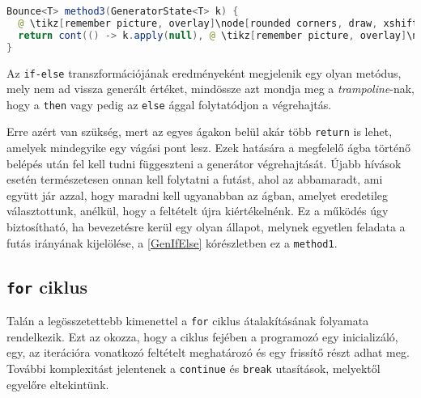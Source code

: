 \begin{center}
\begin{mdframed}
\begin{minipage}[t]{0.6\textwidth}
\begin{lstlisting}[language=Java, numbers=none, breaklines=true]
Bounce<T> method3(GeneratorState<T> k) {
  @ \tikz[remember picture, overlay]\node[rounded corners, draw, xshift=-0.1cm, inner sep=5pt, anchor=west] {Kódrészlet \#2}; \vspace*{0.3cm} @
  return cont(() -> k.apply(null), @ \tikz[remember picture, overlay]\node[rounded corners, draw, xshift=-0.2cm, inner sep=5pt, anchor=west, yshift=0.1cm] {Kifejezés \#2}; \vspace*{0.2cm} \hspace*{1.6cm} @);
}
\end{lstlisting} 
\end{minipage}
\end{mdframed}
\label{GenIfElse}
\end{center}

Az \texttt{if-else} transzformációjának eredményeként megjelenik egy olyan metódus, mely nem ad vissza generált értéket, mindössze azt mondja meg a \textit{trampoline}-nak, hogy a \texttt{then} vagy pedig az \texttt{else} ággal folytatódjon a végrehajtás.

Erre azért van szükség, mert az egyes ágakon belül akár több \texttt{return} is lehet, amelyek mindegyike egy vágási pont lesz. Ezek hatására a megfelelő ágba történő belépés után fel kell tudni függeszteni a generátor végrehajtását. Újabb hívások esetén természetesen onnan kell folytatni a futást, ahol az abbamaradt, ami együtt jár azzal, hogy maradni kell ugyanabban az ágban, amelyet eredetileg választottunk, anélkül, hogy a feltételt újra kiértékelnénk. Ez a működés úgy biztosítható, ha bevezetésre kerül egy olyan állapot, melynek egyetlen feladata a futás irányának kijelölése, a \ref{GenIfElse} kórészletben ez a \texttt{method1}.

\pagebreak

\subsection{\texttt{for} ciklus}

Talán a legösszetettebb kimenettel a \texttt{for} ciklus átalakításának folyamata rendelkezik. Ezt az okozza, hogy a ciklus fejében a programozó egy inicializáló, egy, az iterációra vonatkozó feltételt meghatározó és egy frissítő részt adhat meg. További komplexitást jelentenek a \texttt{continue} és \texttt{break} utasítások, melyektől egyelőre eltekintünk.

